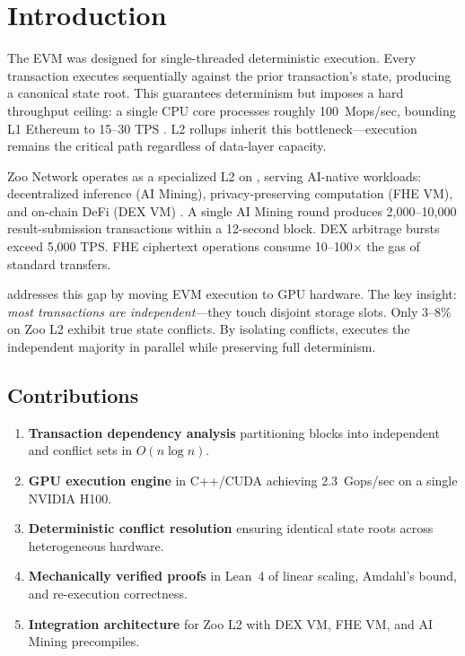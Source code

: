 \section{Introduction}

\label{sec:intro}

The EVM was designed for single-threaded deterministic execution.
Every transaction executes sequentially against the prior transaction's state, producing a canonical state root.
This guarantees determinism but imposes a hard throughput ceiling: a single CPU core processes roughly 100~Mops/sec, bounding L1 Ethereum to 15--30 TPS \cite{wood2014ethereum}.
L2 rollups inherit this bottleneck---execution remains the critical path regardless of data-layer capacity.

Zoo Network operates as a specialized L2 on \Lux{}, serving AI-native workloads: decentralized inference (AI Mining), privacy-preserving computation (FHE VM), and on-chain DeFi (DEX VM) \cite{zoo-network-architecture}.
A single AI Mining round produces 2,000--10,000 result-submission transactions within a 12-second block.
DEX arbitrage bursts exceed 5,000 TPS.
FHE ciphertext operations consume 10--100$\times$ the gas of standard transfers.

\cevm{} addresses this gap by moving EVM execution to GPU hardware.
The key insight: \emph{most transactions are independent}---they touch disjoint storage slots.
Only 3--8\% on Zoo L2 exhibit true state conflicts.
By isolating conflicts, \cevm{} executes the independent majority in parallel while preserving full determinism.

\subsection{Contributions}

\begin{enumerate}[leftmargin=*]
\item \textbf{Transaction dependency analysis} partitioning blocks into independent and conflict sets in $O(n \log n)$.
\item \textbf{GPU execution engine} in C++/CUDA achieving 2.3~Gops/sec on a single NVIDIA H100.
\item \textbf{Deterministic conflict resolution} ensuring identical state roots across heterogeneous hardware.
\item \textbf{Mechanically verified proofs} in Lean~4 of linear scaling, Amdahl's bound, and re-execution correctness.
\item \textbf{Integration architecture} for Zoo L2 with DEX VM, FHE VM, and AI Mining precompiles.
\end{enumerate}

